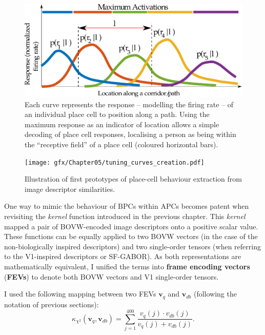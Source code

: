 \begin{figure}
\includegraphics[width=\textwidth]{gfx/Chapter05/APCResponses.pdf}
\caption{Each curve represents the response -- modelling the firing rate -- of an individual place cell to position along a path. Using the maximum response as an indicator of location allows a simple decoding of place cell responses, localising a person as being within the ``receptive field'' of a place cell (coloured horizontal bars).}
\label{fig:APCresponses}
\end{figure}


\begin{figure}
\texttt{[image: gfx/Chapter05/tuning\_curves\_creation.pdf]}
\caption{Illustration of first prototypes of place-cell behaviour extraction from image descriptor similarities.}
\label{fig:creatingAPCs}
\end{figure}


One way to mimic the behaviour of BPCs within APCs becomes patent when revisiting the \textit{kernel} function introduced in the previous chapter. This \textit{kernel} mapped a pair of BOVW-encoded image descriptors onto a positive scalar value. These functions can be equally applied to two BOVW vectors (in the case of the non-biologically inspired descriptors) and two single-order tensors (when referring to the V1-inspired descriptors or SF-GABOR). As both representations are mathematically equivalent, I unified the terms into \textbf{frame encoding vectors} (\textbf{FEVs}) to denote both BOVW vectors and V1 single-order tensors.

I used the following mapping between two FEVs $\mathbf{v}_q$ and $\mathbf{v}_{db}$ (following the notation of previous sections):
\begin{equation}
\kappa_{\chi^2}(\mathbf{v}_q,\mathbf{v}_{db}) = \sum_{j=1}^{400}\frac{v_q(j)\cdot v_{db}(j)}{v_q(j)+v_{db}(j)}.
\end{equation}

